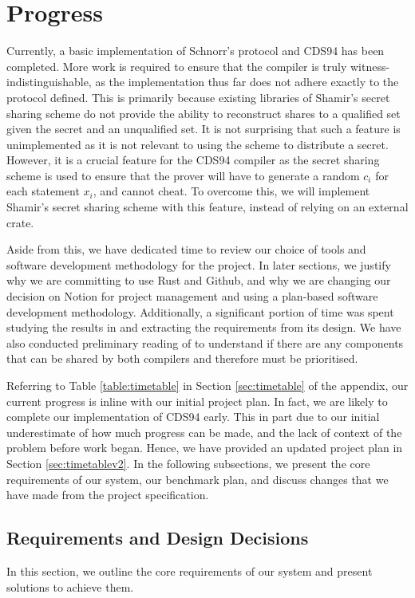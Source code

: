 \section{Progress}
\label{sec:progress}
Currently, a basic implementation of Schnorr's protocol and CDS94 has been completed. More work is required to ensure that the compiler is truly witness-indistinguishable, as the implementation thus far does not adhere exactly to the protocol defined. This is primarily because existing libraries of Shamir's secret sharing scheme do not provide the ability to reconstruct shares to a qualified set given the secret and an unqualified set. It is not surprising that such a feature is unimplemented as it is not relevant to using the scheme to distribute a secret. However, it is a crucial feature for the CDS94 compiler as the secret sharing scheme is used to ensure that the prover will have to generate a random $c_i$ for each statement $x_i$, and cannot cheat. To overcome this, we will implement Shamir's secret sharing scheme with this feature, instead of relying on an external crate. 

Aside from this, we have dedicated time to review our choice of tools and software development methodology for the project. In later sections, we justify why we are committing to use Rust and Github, and why we are changing our decision on Notion for project management and using a plan-based software development methodology. Additionally, a significant portion of time was spent studying the results in \cite{CDS94} and extracting the requirements from its design. We have also conducted preliminary reading of \cite{StackingSigmas} to understand if there are any components that can be shared by both compilers and therefore must be prioritised. 

Referring to Table \ref{table:timetable} in Section \ref{sec:timetable} of the appendix, our current progress is inline with our initial project plan. In fact, we are likely to complete our implementation of CDS94 early. This in part due to our initial underestimate of how much progress can be made, and the lack of context of the problem before work began. Hence, we have provided an updated project plan in Section \ref{sec:timetablev2}. In the following subsections, we present the core requirements of our system, our benchmark plan, and discuss changes that we have made from the project specification. 

\subsection{Requirements and Design Decisions}\label{progress:requirements}
In this section, we outline the core requirements of our system and present solutions to achieve them.

